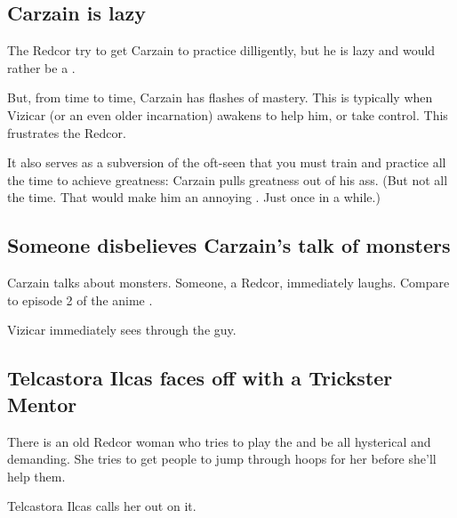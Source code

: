 \subsection{Carzain is lazy}
The Redcor try to get Carzain to practice dilligently, but he is lazy and would rather be a \boheme. 

But, from time to time, Carzain has flashes of mastery. This is typically when Vizicar (or an even older incarnation) awakens to help him, or take control. This frustrates the Redcor. 

It also serves as a subversion of the oft-seen  that you must train and practice all the time to achieve greatness: Carzain pulls greatness out of his ass. (But not all the time. That would make him an annoying . Just once in a while.)









\subsection{Someone disbelieves Carzain's talk of monsters}
Carzain talks about monsters. Someone, a Redcor, immediately laughs.  Compare to episode 2 of the anime \cite{Anime:Gilgamesh}.

Vizicar immediately sees through the guy. 









\subsection{Telcastora Ilcas faces off with a Trickster Mentor}
There is an old Redcor woman who tries to play the  and be all hysterical and demanding. She tries to get people to jump through hoops for her before she'll help them. 

Telcastora Ilcas calls her out on it. 

